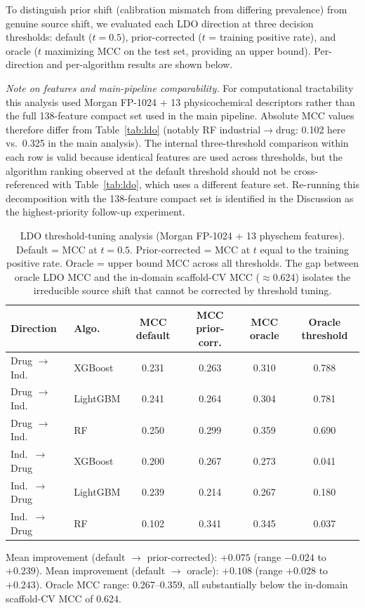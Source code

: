 To distinguish prior shift (calibration mismatch from differing prevalence) from genuine 
source shift, we evaluated each LDO direction at three decision thresholds: default 
($t = 0.5$), prior-corrected ($t$ = training positive rate), and oracle ($t$ maximizing MCC 
on the test set, providing an upper bound). Per-direction and per-algorithm results are 
shown below.

\textit{Note on features and main-pipeline comparability.} For computational tractability 
this analysis used Morgan FP-1024 + 13 physicochemical descriptors rather than the full 
138-feature compact set used in the main pipeline. Absolute MCC values therefore differ from 
Table~\ref{tab:ldo} (notably RF industrial$\to$drug: 0.102 here vs.\ 0.325 in the main 
analysis). The internal three-threshold comparison within each row is valid because 
identical features are used across thresholds, but the algorithm ranking observed at the 
default threshold should not be cross-referenced with Table~\ref{tab:ldo}, which uses a 
different feature set. Re-running this decomposition with the 138-feature compact set is 
identified in the Discussion as the highest-priority follow-up experiment.


\begin{table}[ht]
\caption{LDO threshold-tuning analysis (Morgan FP-1024 + 13 physchem features). Default = 
MCC at $t = 0.5$. Prior-corrected = MCC at $t$ equal to the training positive rate. Oracle 
= upper bound MCC across all thresholds. The gap between oracle LDO MCC and the in-domain 
scaffold-CV MCC ($\approx$0.624) isolates the irreducible source shift that cannot be 
corrected by threshold tuning.}
\centering
\small
\begin{tabular}{@{}llcccc@{}}
\toprule
Direction & Algo. & MCC default & MCC prior-corr. & MCC oracle & Oracle threshold \\
\midrule
Drug $\to$ Ind.\ & XGBoost  & 0.231 & 0.263 & 0.310 & 0.788 \\
Drug $\to$ Ind.\ & LightGBM & 0.241 & 0.264 & 0.304 & 0.781 \\
Drug $\to$ Ind.\ & RF       & 0.250 & 0.299 & 0.359 & 0.690 \\
Ind.\ $\to$ Drug & XGBoost  & 0.200 & 0.267 & 0.273 & 0.041 \\
Ind.\ $\to$ Drug & LightGBM & 0.239 & 0.214 & 0.267 & 0.180 \\
Ind.\ $\to$ Drug & RF       & 0.102 & 0.341 & 0.345 & 0.037 \\
\bottomrule
\end{tabular}

\medskip
\footnotesize
Mean improvement (default $\to$ prior-corrected): $+0.075$ (range $-0.024$ to $+0.239$).
Mean improvement (default $\to$ oracle): $+0.108$ (range $+0.028$ to $+0.243$).
Oracle MCC range: 0.267--0.359, all substantially below the in-domain scaffold-CV MCC of 
0.624.
\end{table}

